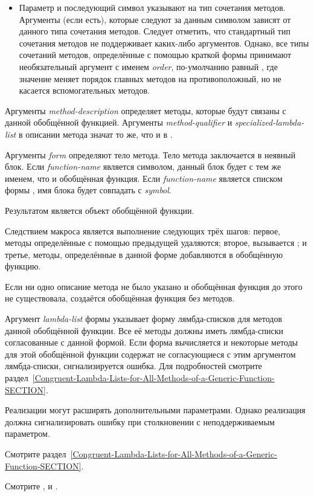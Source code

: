 \begin{defmac}
\begin{itemize}
\item 
Параметр  и последующий символ указывают на тип
сочетания методов. Аргументы (если есть), которые следуют за данным символом
зависят от данного типа сочетания методов. Следует отметить, что стандартный
тип сочетания методов не поддерживает каких-либо аргументов. Однако, все типы
сочетаний методов, определённые с помощью краткой формы
 принимают необязательный аргумент с именем
\emph{order}, по-умолчанию равный , где значение
 меняет порядок главных методов на противоположный, но
не касается вспомогательных методов.
\end{itemize}

Аргументы \emph{method-description} определяет методы, которые будут связаны с
данной обобщённой функцией. Аргументы \emph{method-qualifier} и
\emph{specialized-lambda-list} в описании метода значат то же, что и в
.

Аргументы \emph{form} определяют тело метода. Тело метода заключается в неявный
блок. Если \emph{function-name} является символом, данный блок будет с тем же
именем, что и обобщённая функция. Если \emph{function-name} является списком
формы , имя блока будет совпадать с \emph{symbol}.

Результатом является объект обобщённой функции.

Следствием макроса  является выполнение следующих трёх шагов:
первое, методы определённые с помощью предыдущей  удаляются;
второе, вызывается ; и третье, методы, определённые
в данной форме  добавляются в обобщённую функцию.

Если ни одно описание метода не было указано и обобщённая функция до этого не
существовала, создаётся обобщённая функция без методов.

Аргумент \emph{lambda-list} формы  указывает форму
лямбда-списков для методов данной обобщённой функции. Все её методы должны иметь
лямбда-списки согласованные с данной формой. Если форма 
вычисляется и некоторые методы для этой обобщённой функции содержат не
согласующиеся с этим аргументом лямбда-списки, сигнализируется ошибка. Для
подробностей смотрите
раздел~\ref{Congruent-Lambda-Lists-for-All-Methods-of-a-Generic-Function-SECTION}.

Реализации могут расширять  дополнительными параметрами.
Однако реализация должна сигнализировать ошибку при столкновении с
неподдерживаемым параметром.

Смотрите
раздел~\ref{Congruent-Lambda-Lists-for-All-Methods-of-a-Generic-Function-SECTION}.

Смотрите ,  и
.
\end{defmac}

